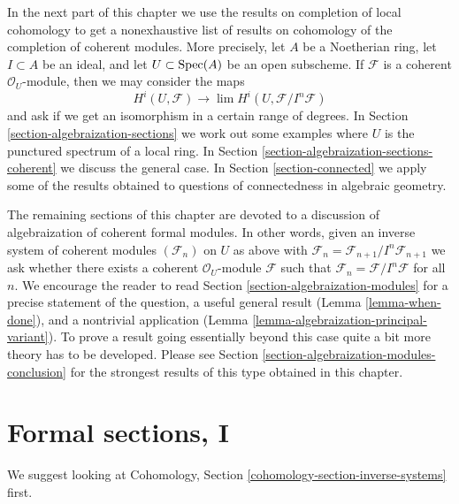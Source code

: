 \medskip\noindent
In the next part of this chapter we use the results on
completion of local cohomology to get a nonexhaustive list of results on
cohomology of the completion of coherent modules.
More precisely, let $A$ be a Noetherian ring, let $I \subset A$
be an ideal, and let $U \subset \mathop{\mathrm{Spec}}(A)$ be an open subscheme.
If $\mathcal{F}$ is a coherent $\mathcal{O}_U$-module, then
we may consider the maps
$$
H^i(U, \mathcal{F}) \longrightarrow \lim H^i(U, \mathcal{F}/I^n\mathcal{F})
$$
and ask if we get an isomorphism in a certain range of degrees.
In Section \ref{section-algebraization-sections}
we work out some examples where $U$ is the punctured spectrum
of a local ring. In Section \ref{section-algebraization-sections-coherent}
we discuss the general case.
In Section \ref{section-connected} we apply some of the results
obtained to questions of connectedness in algebraic geometry.

\medskip\noindent
The remaining sections of this chapter are devoted to a discussion
of algebraization of coherent formal modules. In other words, given
an inverse system of coherent modules $(\mathcal{F}_n)$ on $U$
as above with
$\mathcal{F}_n = \mathcal{F}_{n + 1}/I^n\mathcal{F}_{n + 1}$
we ask whether there exists a coherent $\mathcal{O}_U$-module
$\mathcal{F}$ such that
$\mathcal{F}_n = \mathcal{F}/I^n\mathcal{F}$
for all $n$. We encourage the reader to read
Section \ref{section-algebraization-modules}
for a precise statement of the question, a useful general result
(Lemma \ref{lemma-when-done}), and a nontrivial application
(Lemma \ref{lemma-algebraization-principal-variant}).
To prove a result going essentially beyond this case
quite a bit more theory has to be developed.
Please see Section \ref{section-algebraization-modules-conclusion}
for the strongest results of this type obtained in this chapter.



\section{Formal sections, I}
\label{section-ML-degree-zero}

\noindent
We suggest looking at
Cohomology, Section \ref{cohomology-section-inverse-systems} first.


